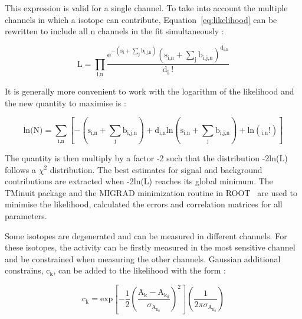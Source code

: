\documentclass[main.tex]{subfiles}
\begin{document}
\bigskip


\NI This expression is valid for a single channel. To take into account the multiple channels in which a isotope can contribute, Equation~\ref{eq:likelihood} can be rewritten to include all n channels in the fit simultaneously : 


\begin{equation}
\text{L} = \prod_{\text{i,n}} \frac{\text{e}^{-(\text{s}_\text{i}+ \sum_\text{j} \text{b}_{\text{i,j,n}})} (\text{s}_{\text{i,n}} + \sum _\text{j} \text{b}_{\text{i,j,n}})^{\text{d}_{\text{i,n}}} } {\text{d}_\text{i}~\text{!}}
\end{equation}


\bigskip


\NI It is generally more convenient to work with the logarithm of the likelihood and the new quantity to maximise is :


\begin{equation}
\text{ln(N)} = \sum_{\text{i,n}} \left[ -(\text{s}_{\text{i,n}} + \sum_\text{j} \text{b}_{\text{i,j,n}}) + \text{d}_{\text{i,n}} \text{ln} \left( \text{s}_{\text{i,n}} + \sum_\text{j} \text{b}_{\text{i,j,n}}\right) + \text{ln}(\text{}_{\text{i,n}} \text{!})  \right]
\end{equation}


\bigskip


\NI The quantity is then multiply by a factor -2 such that the distribution -2ln(L) follows a $\chi^\text{2}$ distribution. The best estimates for signal and background contributions are extracted when -2ln(L) reaches its global minimum. The TMinuit package and the MIGRAD minimization routine in ROOT~\cite{Root} are used to minimise the likelihood, calculated the errors and correlation matrices for all parameters.



\bigskip


\NI Some isotopes are degenerated and can be measured in different channels. For these isotopes, the activity can be firstly measured in the most sensitive channel and be constrained when measuring the other channels. Gaussian additional constrains, c$_\text{k}$, can be added to the likelihood with the form : 

\begin{equation}
\text{c}_\text{k} = \text{exp} \left[ -\frac{\text{1}}{\text{2}} \left( \frac{\text{A}_\text{k} - \text{A}_{\text{k}_\text{0}}}{\sigma_{\text{A}_{\text{k}_\text{0}}}} \right)^\text{2} \right] \left(  \frac{\text{1}}{\text{2}\pi \sigma_{\text{A}_{\text{k}_\text{0}}}} \right) 
\end{equation}
\end{document}
